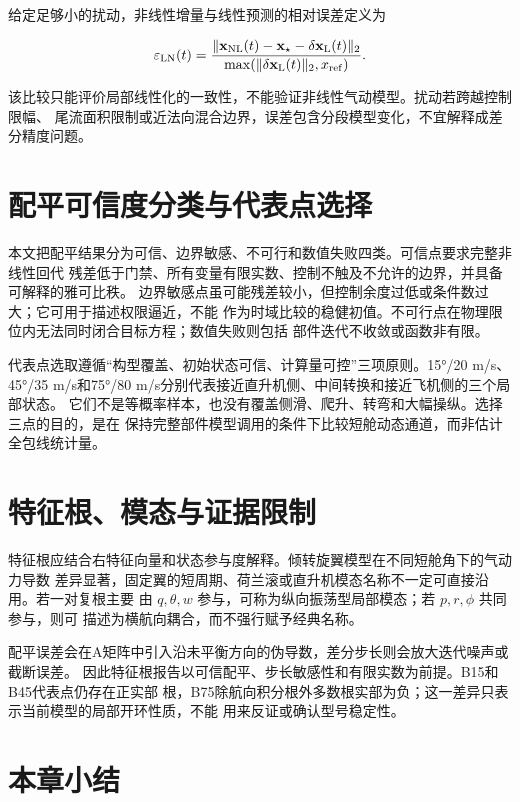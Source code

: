 \documentclass[UTF8,12pt,oneside,openany,fontset=windows]{ctexbook}
\begin{document}
给定足够小的扰动，非线性增量与线性预测的相对误差定义为

\begin{equation}
\varepsilon_{\rm LN}(t)=
\frac{\|\mathbf x_{\rm NL}(t)-\mathbf x_\star-\delta\mathbf x_{\rm L}(t)\|_2}
{\max(\|\delta\mathbf x_{\rm L}(t)\|_2,x_{\rm ref})}.
\end{equation}

该比较只能评价局部线性化的一致性，不能验证非线性气动模型。扰动若跨越控制限幅、 尾流面积限制或近法向混合边界，误差包含分段模型变化，不宜解释成差分精度问题。

\section{配平可信度分类与代表点选择}

本文把配平结果分为可信、边界敏感、不可行和数值失败四类。可信点要求完整非线性回代 残差低于门禁、所有变量有限实数、控制不触及不允许的边界，并具备可解释的雅可比秩。 边界敏感点虽可能残差较小，但控制余度过低或条件数过大；它可用于描述权限逼近，不能 作为时域比较的稳健初值。不可行点在物理限位内无法同时闭合目标方程；数值失败则包括 部件迭代不收敛或函数非有限。

代表点选取遵循“构型覆盖、初始状态可信、计算量可控”三项原则。15°/20 m/s、 45°/35 m/s和75°/80 m/s分别代表接近直升机侧、中间转换和接近飞机侧的三个局部状态。 它们不是等概率样本，也没有覆盖侧滑、爬升、转弯和大幅操纵。选择三点的目的，是在 保持完整部件模型调用的条件下比较短舱动态通道，而非估计全包线统计量。

\section{特征根、模态与证据限制}

特征根应结合右特征向量和状态参与度解释。倾转旋翼模型在不同短舱角下的气动力导数 差异显著，固定翼的短周期、荷兰滚或直升机模态名称不一定可直接沿用。若一对复根主要 由 \(q,\theta,w\) 参与，可称为纵向振荡型局部模态；若 \(p,r,\phi\) 共同参与，则可 描述为横航向耦合，而不强行赋予经典名称。

配平误差会在A矩阵中引入沿未平衡方向的伪导数，差分步长则会放大迭代噪声或截断误差。 因此特征根报告以可信配平、步长敏感性和有限实数为前提。B15和B45代表点仍存在正实部 根，B75除航向积分根外多数根实部为负；这一差异只表示当前模型的局部开环性质，不能 用来反证或确认型号稳定性。

\section{本章小结}
\end{document}
